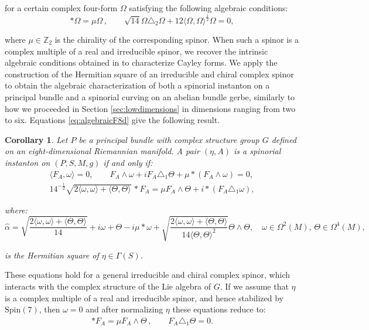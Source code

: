 \documentclass[10pt,a4paper,twoside,reqno]{amsart}
\theoremstyle{plain}
\newtheorem{cor}[thm]{Corollary}
\theoremstyle{definition}
\theoremstyle{remark}
\def\Spin{\mathrm{Spin}}
\def\Spin{\mathrm{Spin}}
\newcommand{\escal}[1]{\langle#1\rangle}
\begin{document}
\noindent
for a certain complex four-form $\Omega$ satisfying the following algebraic conditions:
\begin{equation*}
\ast \Omega = \mu \Omega\, , \qquad \sqrt{14}\Omega\triangle_2\Omega + 12  \langle \Omega , \Omega \rangle^{\frac{1}{2}} \Omega = 0,
\end{equation*} 
 
\noindent
where $\mu\in\mathbb{Z}_2$ is the chirality of the corresponding spinor. When such a spinor is a complex multiple of a real and irreducible spinor, we recover the intrinsic algebraic conditions obtained in \cite{LS24_Spin7} to characterize Cayley forms. We apply the construction of the Hermitian square of an irreducible and chiral complex spinor to obtain the algebraic characterization of both a spinorial instanton on a principal bundle and a spinorial curving on an abelian bundle gerbe, similarly to how we proceeded in Section \ref{sec:lowdimensions} in dimensions ranging from two to six. Equations \eqref{eq:algebraicF8d} give the following result.

\begin{cor}
Let $P$ be a principal bundle with complex structure group $G$ defined on an eight-dimensional Riemannian manifold. A pair $(\eta,A)$ is a spinorial instanton on $(P,S,M,g)$ if and only if:
\begin{gather*}
\langle F_A , \omega \rangle = 0,\qquad F_A\wedge \omega  + i F_A\triangle_1 \Theta  +  \mu \ast (F_A\wedge \omega)   = 0,\\
14^{-\frac{1}{2}}\sqrt{ 2\escal{\omega,\omega}+\escal{\Theta,\Theta}} \,\ast F_A = \mu F_A\wedge \Theta + i \ast (F_A\triangle_1\omega),
\end{gather*}

\noindent
where:
\begin{equation*}
\widehat{\alpha} = \sqrt{\frac{2\escal{\omega,\omega}+\escal{\Theta,\Theta}}{14}} + i\omega + \Theta-i\mu*\omega +  \sqrt{\frac{2\escal{\omega,\omega}+\escal{\Theta,\Theta}}{14 \escal{\Theta,\Theta}^2 }}\Theta \wedge \Theta,\quad \omega\in\Omega^2(M),\,\Theta\in\Omega^4(M),
\end{equation*}

\noindent
is the Hermitian square of $\eta\in\Gamma(S)$.
\end{cor}

\noindent
These equations hold for a general irreducible and chiral complex spinor, which interacts with the complex structure of the Lie algebra of $G$. If we assume that $\eta$ is a complex multiple of a real and irreducible spinor, and hence stabilized by $\Spin(7)$, then $\omega = 0$ and after normalizing $\eta$ these equations reduce to:
\begin{eqnarray*}
\ast F_A = \mu F_A\wedge \Theta   \, , \qquad F_A\triangle_1 \Theta = 0.
\end{eqnarray*}
\end{document}
